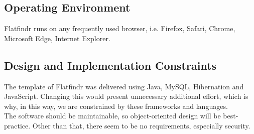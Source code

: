 \subsection{Operating Environment}
	Flatfindr runs on any frequently used browser, i.e. Firefox, Safari, Chrome, Microsoft Edge, Internet Explorer.
	
\subsection{Design and Implementation Constraints}
	The template of Flatfindr was delivered using Java, MySQL, Hibernation and JavaScript. Changing this would 
	present unnecessary additional effort, which is why, in this way, we are constrained by these frameworks and languages.\\
	The software should be maintainable, so object-oriented design will be best-practice.
	Other than that, there seem to be no requirements, especially security.
